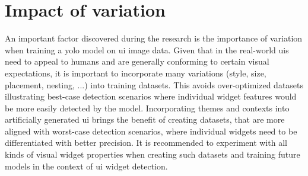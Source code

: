 \documentclass[Bachelor, BIC, english, fhCitStyle, IEEE]{BASE/twbook} %
\begin{document}
\section{Impact of variation}
An important factor discovered during the research is the importance of variation when training a \ac{yolo} model on \ac{ui} image data. Given that in the real-world \acp{ui} need to appeal to humans and are generally conforming to certain visual expectations, it is important to incorporate many variations (style, size, placement, nesting, ...) into training datasets. This avoids over-optimized datasets illustrating best-case detection scenarios where individual widget features would be more easily detected by the model. Incorporating themes and contexts into artificially generated \ac{ui} brings the benefit of creating datasets, that are more aligned with worst-case detection scenarios, where individual widgets need to be differentiated with better precision. It is recommended to experiment with all kinds of visual widget properties when creating such datasets and training future models in the context of \ac{ui} widget detection.
\end{document}
